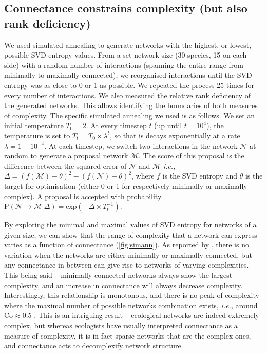 \subsection{Connectance constrains complexity (but also rank
deficiency)}\label{connectance-constrains-complexity-but-also-rank-deficiency}

We used simulated annealing \cite{Kirkpatrick1984OptSim} to generate networks
with the highest, or lowest, possible SVD entropy values. From a set network
size (30 species, 15 on each side) with a random number of interactions
(spanning the entire range from minimally to maximally connected), we
reorganised interactions until the SVD entropy was as close to 0 or 1 as
possible. We repeated the process 25 times for every number of interactions. We
also measured the relative rank deficiency of the generated networks. This
allows identifying the boundaries of both measures of complexity. The specific
simulated annealing we used is as follows. We set an initial temperature \(T_0 =
2\). At every timestep \(t\) (up until \(t = 10^4\)), the temperature is set to
\(T_t = T_0\times\lambda^t\), so that is decays exponentially at a rate
\(\lambda = 1 - 10^{-4}\). At each timestep, we switch two interactions in the
network \(\mathcal{N}\) at random to generate a proposal network
\(\mathcal{M}\). The score of this proposal is the difference between the
squared error of \(\mathcal{N}\) and \(\mathcal{M}\) \emph{i.e.,} \(\Delta =
(f(\mathcal{M})-\theta)^2-(f(\mathcal{N})-\theta)^2\), where \(f\) is the SVD
entropy and \(\theta\) is the target for optimisation (either 0 or 1 for
respectively minimally or maximally complex). A proposal is accepted with
probability \(\text{P}(\mathcal{N} \rightarrow \mathcal{M} | \Delta) =
\text{exp}\left(-\Delta\times T_t^{-1}\right)\).

By exploring the minimal and maximal values of SVD entropy for networks of a
given size, we can show that the range of complexity that a network can express
varies as a function of connectance (\autoref{fig:simann}). As reported by
\cite{Poisot2014WheEco}, there is no variation when the networks are
either minimally or maximally connected, but any connectance in between can give
rise to networks of varying complexities. This being said -- minimally connected
networks always show the largest complexity, and an increase in connectance will
always decrease complexity. Interestingly, this relationship is monotonous, and
there is no peak of complexity where the maximal number of possible networks
combination exists, \emph{i.e.,} around \(\text{Co} \approx 0.5\)
\cite{Poisot2014WheEco}. This is an intriguing result -- ecological networks are
indeed extremely complex, but whereas ecologists have usually interpreted
connectance as a measure of complexity, it is in fact sparse networks that are
the complex ones, and connectance acts to decomplexify network structure.

